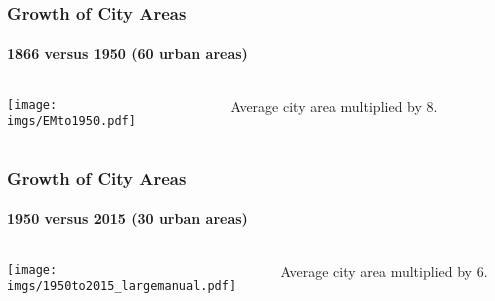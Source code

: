 \documentclass[aspectratio=169]{beamer}
\begin{document}
\begin{v75mins}

\begin{frame}
\frametitle{Growth of City Areas}
\framesubtitle{1866 versus 1950 (60 urban areas)}

\begin{columns}
\begin{column}{0.8\textwidth}
	\begin{adjustbox}{right}
	\texttt{[image: \\imgs/EMto1950.pdf]}\end{adjustbox}
\end{column}
\begin{column}{0.3\textwidth}
\begin{midi}
\item Average city area multiplied by 8.
\end{midi}
\end{column}
\end{columns}
\end{frame}

\begin{frame}
\frametitle{Growth of City Areas}
\framesubtitle{1950 versus 2015 (30 urban areas)}\begin{columns}
\begin{column}{0.8\textwidth}
	\begin{adjustbox}{right}
	\texttt{[image: \\imgs/1950to2015\_largemanual.pdf]}\end{adjustbox}
\end{column}
\begin{column}{0.3\textwidth}
\begin{midi}
\item Average city area multiplied by 6.
\end{midi}
\end{column}
\end{columns}
\end{frame}\end{v75mins}

\end{document}
